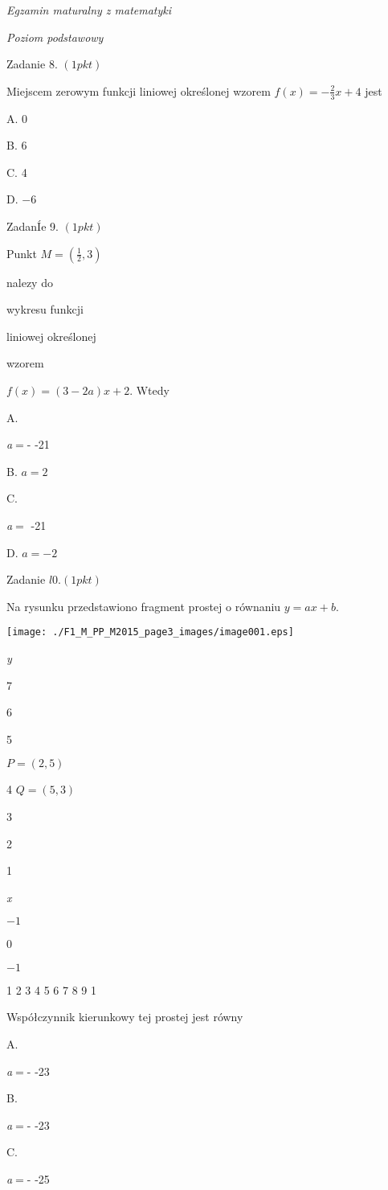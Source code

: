 \documentclass[a4paper,12pt]{article}
\begin{document}
{\it Egzamin maturalny z matematyki}

{\it Poziom podstawowy}

Zadanie 8. $(1pkt)$

Miejscem zerowym funkcji liniowej określonej wzorem $f(x)=-\displaystyle \frac{2}{3}x+4$ jest

A. 0

B. 6

C. 4

D. $-6$

ZadanÍe 9. $(1pkt)$

Punkt $M=(\displaystyle \frac{1}{2},3)$

nalezy do

wykresu funkcji

liniowej określonej

wzorem

$f(x)=(3-2a)x+2$. Wtedy

A.

{\it a}$=$- -21

B. $a=2$

C.

{\it a}$=$ -21

D. $a=-2$

Zadanie $l0. (1pkt)$

Na rysunku przedstawiono fragment prostej o równaniu $y=ax+b.$
\begin{center}
\texttt{[image: ./F1\_M\_PP\_M2015\_page3\_images/image001.eps]}
\end{center}
{\it y}

7

6

5

$P=(2,5)$

4  $Q=(5,3)$

3

2

1

{\it x}

$-1$

0

$-1$

1 2 3 4  5 6 7 8  9 1

Współczynnik kierunkowy tej prostej jest równy

A.

{\it a}$=$- -23

B.

{\it a}$=$- -23

C.

{\it a}$=$- -25
\end{document}
